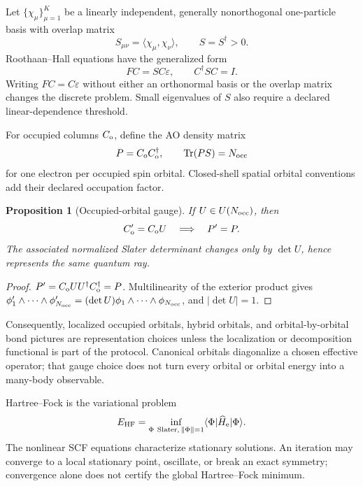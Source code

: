 \documentclass[11pt,a4paper]{article}
\theoremstyle{definition}
\theoremstyle{plain}
\newtheorem{proposition}[definition]{Proposition}
\theoremstyle{remark}
\newcommand{\norm}[1]{\left\lVert #1\right\rVert}
\newcommand{\abs}[1]{\left\lvert #1\right\rvert}
\newcommand{\Tr}{\operatorname{Tr}}
\begin{document}
Let \(\{\chi_\mu\}_{\mu=1}^K\) be a linearly independent, generally
nonorthogonal one-particle basis with overlap matrix
\[
S_{\mu\nu}=\langle\chi_\mu,\chi_\nu\rangle,
\qquad S=S^\dagger>0.
\]
Roothaan--Hall equations have the generalized form
\begin{equation}\label{eq:roothaan}
FC=SC\varepsilon,
\qquad
C^\dagger SC=I.
\end{equation}
Writing \(FC=C\varepsilon\) without either an orthonormal basis or the
overlap matrix changes the discrete problem.  Small eigenvalues of
\(S\) also require a declared linear-dependence threshold.

For occupied columns \(C_{\rm o}\), define the AO density matrix
\begin{equation}\label{eq:ao-density}
P=C_{\rm o}C_{\rm o}^\dagger,
\qquad
\Tr(PS)=N_{\rm occ}
\end{equation}
for one electron per occupied spin orbital.  Closed-shell spatial
orbital conventions add their declared occupation factor.

\begin{proposition}[Occupied-orbital gauge]
\label{prop:occupied-gauge}
If \(U\in U(N_{\rm occ})\), then
\[
C_{\rm o}'=C_{\rm o}U
\quad\Longrightarrow\quad
P'=P.
\]
The associated normalized Slater determinant changes only by
\(\det U\), hence represents the same quantum ray.
\end{proposition}

\begin{proof}
\(P'=C_{\rm o}UU^\dagger C_{\rm o}^\dagger=P\).  Multilinearity of
the exterior product gives
\(\phi_1'\wedge\cdots\wedge\phi_{N_{\rm occ}}'
=(\det U)\phi_1\wedge\cdots\wedge\phi_{N_{\rm occ}}\), and
\(\abs{\det U}=1\).
\end{proof}

Consequently, localized occupied orbitals, hybrid orbitals, and
orbital-by-orbital bond pictures are representation choices unless
the localization or decomposition functional is part of the
protocol.  Canonical orbitals diagonalize a chosen effective
operator; that gauge choice does not turn every orbital or orbital
energy into a many-body observable.

Hartree--Fock is the variational problem
\begin{equation}\label{eq:hf-variational}
E_{\rm HF}
=\inf_{\Phi\ {\rm Slater},\,\norm{\Phi}=1}
\langle\Phi|\widehat H_{\rm e}|\Phi\rangle .
\end{equation}
The nonlinear SCF equations characterize stationary solutions.
An iteration may converge to a local stationary point, oscillate, or
break an exact symmetry; convergence alone does not certify the
global Hartree--Fock minimum.
\end{document}
